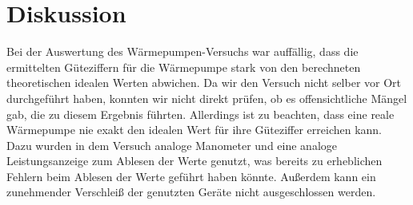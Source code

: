 \section{Diskussion}
\label{sec:Diskussion}
Bei der Auswertung des Wärmepumpen-Versuchs war auffällig, dass die ermittelten Güteziffern für die Wärmepumpe stark 
von den berechneten theoretischen idealen Werten abwichen. Da wir den Versuch nicht selber vor Ort durchgeführt haben, 
konnten wir nicht direkt prüfen, ob es offensichtliche Mängel gab, die zu diesem Ergebnis führten. Allerdings ist zu beachten, 
dass eine reale Wärmepumpe nie exakt den idealen Wert für ihre Güteziffer erreichen kann. Dazu wurden in dem Versuch analoge
Manometer und eine analoge Leistungsanzeige zum Ablesen der Werte genutzt, was bereits zu erheblichen Fehlern beim Ablesen der 
Werte geführt haben könnte.
Außerdem kann ein zunehmender Verschleiß der genutzten Geräte nicht ausgeschlossen werden.